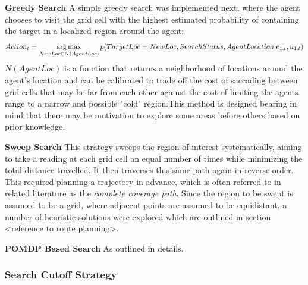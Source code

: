 \textbf{Greedy Search}
A simple greedy search was implemented next, where the agent chooses to visit the grid cell with the highest estimated probability of containing the target in a localized region around the agent:
\footnotesize
\[
Action_t = \operatorname*{arg\,max}_{NewLoc \in N(AgentLoc)}{p(TargetLoc = NewLoc, SearchStatus, AgentLocation| e_{1:t}, u_{1:t})}
\]
\normalsize
$N(AgentLoc)$ is a function that returns a neighborhood of locations around the agent's location and can be calibrated to trade off the cost of saccading between grid cells that may be far from each other against the cost of limiting the agents range to a narrow and possible "cold" region.This method is designed bearing in mind that there may be motivation to explore some areas before others based on prior knowledge. 


\textbf{Sweep Search}
This strategy sweeps the region of interest systematically, aiming to take a reading at each grid cell an equal number of times while minimizing the total distance travelled. It then traverses this same path again in reverse order. This required planning a trajectory in advance, which is often referred to in related literature as the \textit{complete coverage path}. Since the region to be swept is assumed to be a grid, where adjacent points are assumed to be equidistant, a number of heuristic solutions were explored which are outlined in section <reference to route planning>.\par

\textbf{POMDP Based Search} 
As outlined in 
details. \par

\subsubsection{Search Cutoff Strategy}

\label{searchTermination}



